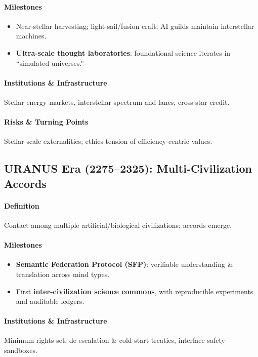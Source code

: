 \documentclass[11pt]{article}
\begin{document}
\paragraph{Milestones}
\begin{itemize}[noitemsep]
  \item Near-stellar harvesting; light-sail/fusion craft; AI guilds maintain interstellar machines.
  \item \textbf{Ultra-scale thought laboratories}: foundational science iterates in ``simulated universes.''
\end{itemize}

\paragraph{Institutions \& Infrastructure} Stellar energy markets, interstellar spectrum and lanes, cross-star credit.

\paragraph{Risks \& Turning Points} Stellar-scale externalities; ethics tension of efficiency-centric values.

\subsection{URANUS Era (2275–2325): Multi-Civilization Accords}
\paragraph{Definition} Contact among multiple artificial/biological civilizations; accords emerge.

\paragraph{Milestones}
\begin{itemize}[noitemsep]
  \item \textbf{Semantic Federation Protocol (SFP)}: verifiable understanding \& translation across mind types.
  \item First \textbf{inter-civilization science commons}, with reproducible experiments and auditable ledgers.
\end{itemize}

\paragraph{Institutions \& Infrastructure} Minimum rights set, de-escalation \& cold-start treaties, interface safety sandboxes.
\end{document}
